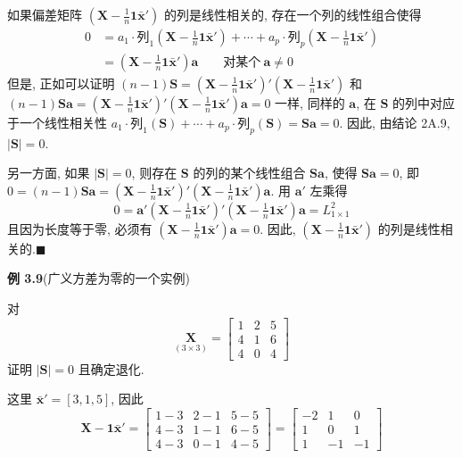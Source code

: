 \noindent{}\quad 如果偏差矩阵 $(\mathbf{X}-\frac{1}{n}\mathbf{1}\bar{\mathbf{x}}')$ 的列是线性相关的, 存在一个列的线性组合使得
\begin{align*}
0&=a_{1}\cdot\text{列}_{1}(\mathbf{X}-\tfrac{1}{n}\mathbf{1}\bar{\mathbf{x}}')+\cdots+a_{p}\cdot\text{列}_{p}(\mathbf{X}-\tfrac{1}{n}\mathbf{1}\bar{\mathbf{x}}')\\
&=(\mathbf{X}-\tfrac{1}{n}\mathbf{1}\bar{\mathbf{x}}')\mathbf{a}\qquad\text{对某个}\ \mathbf{a}\ne0
\end{align*}
但是, 正如可以证明 $(n-1)\mathbf{S}=(\mathbf{X}-\frac{1}{n}\mathbf{1}\bar{\mathbf{x}}')'(\mathbf{X}-\frac{1}{n}\mathbf{1}\bar{\mathbf{x}}')$ 和 $(n-1)\mathbf{S}\mathbf{a}=(\mathbf{X}-\frac{1}{n}\mathbf{1}\bar{\mathbf{x}}')'(\mathbf{X}-\frac{1}{n}\mathbf{1}\bar{\mathbf{x}}')\mathbf{a}=0$ 一样, 同样的 $\mathbf{a}$, 在 $\mathbf{S}$ 的列中对应于一个线性相关性 $a_{1}\cdot\text{列}_{1}(\mathbf{S})+\cdots+a_{p}\cdot\text{列}_{p}(\mathbf{S})=\mathbf{S}\mathbf{a}=0$. 因此, 由结论 2A.9, $|\mathbf{S}|=0$.

另一方面, 如果 $|\mathbf{S}|=0$, 则存在 $\mathbf{S}$ 的列的某个线性组合 $\mathbf{S}\mathbf{a}$, 使得 $\mathbf{S}\mathbf{a}=0$, 即 $0=(n-1)\mathbf{S}\mathbf{a}=(\mathbf{X}-\frac{1}{n}\mathbf{1}\bar{\mathbf{x}}')'(\mathbf{X}-\frac{1}{n}\mathbf{1}\bar{\mathbf{x}}')\mathbf{a}$. 用 $\mathbf{a}'$ 左乘得
\[
0=\mathbf{a}'(\mathbf{X}-\tfrac{1}{n}\mathbf{1}\bar{\mathbf{x}}')'(\mathbf{X}-\tfrac{1}{n}\mathbf{1}\bar{\mathbf{x}}')\mathbf{a}=L^{2}_{1\times1}
\]
且因为长度等于零, 必须有 $(\mathbf{X}-\frac{1}{n}\mathbf{1}\bar{\mathbf{x}}')\mathbf{a}=0$. 因此, $(\mathbf{X}-\frac{1}{n}\mathbf{1}\bar{\mathbf{x}}')$ 的列是线性相关的.\hfill$\blacksquare$

\noindent\textbf{例 3.9}\quad (广义方差为零的一个实例)

对
\[
\underset{(3\times3)}{\mathbf{X}}=\begin{bmatrix}1&2&5\\4&1&6\\4&0&4\end{bmatrix}
\]
证明 $|\mathbf{S}|=0$ 且确定退化.

这里 $\bar{\mathbf{x}}'=[3,1,5]$, 因此
\[
\mathbf{X}-\mathbf{1}\bar{\mathbf{x}}'=\begin{bmatrix}1-3&2-1&5-5\\4-3&1-1&6-5\\4-3&0-1&4-5\end{bmatrix}=\begin{bmatrix}-2&1&0\\1&0&1\\1&-1&-1\end{bmatrix}
\]

